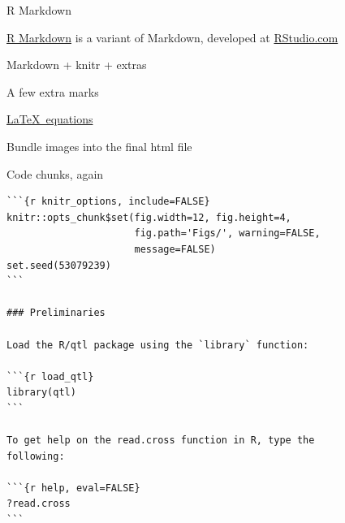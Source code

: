 \documentclass[12pt,t]{beamer}
\begin{document}
\begin{frame}[fragile]{R Markdown}

\vspace{24pt}

\bi
\itemsep12pt
\item \href{http://rmarkdown.rstudio.com}{R Markdown} is a variant of Markdown, developed at
  \href{http://www.rstudio.com}{RStudio.com}
\item Markdown + knitr + extras
\item A few extra marks
\item \href{http://www.rstudio.com/ide/docs/authoring/using_markdown_equations}{\LaTeX\ equations}
\item Bundle images into the final html file
\ei

\end{frame}


\begin{frame}[fragile]{Code chunks, again}

\vspace{6pt}

\begin{lstlisting}
```{r knitr_options, include=FALSE}
knitr::opts_chunk$set(fig.width=12, fig.height=4,
                      fig.path='Figs/', warning=FALSE,
                      message=FALSE)
set.seed(53079239)
```

### Preliminaries

Load the R/qtl package using the `library` function:

```{r load_qtl}
library(qtl)
```

To get help on the read.cross function in R, type the
following:

```{r help, eval=FALSE}
?read.cross
```
\end{lstlisting}

\vfill

\hfill {\footnotesize {}}


\end{frame}
\end{document}
